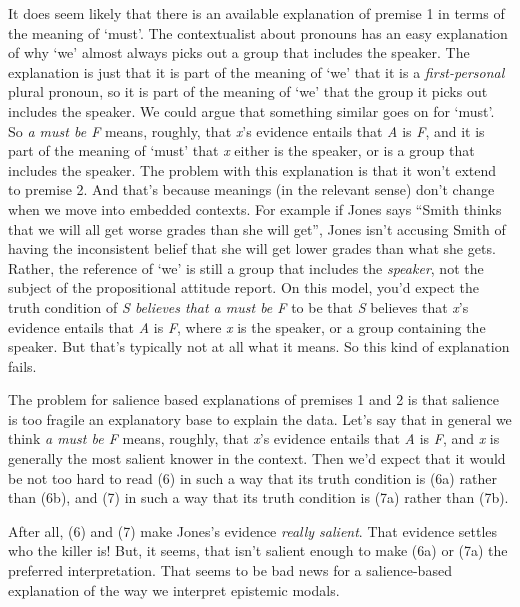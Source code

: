 \documentclass[
  10pt,
  letterpaper,
  DIV=11,
  numbers=noendperiod,
  twoside]{scrartcl}
\begin{document}
It does seem likely that there is an available explanation of premise 1
in terms of the meaning of `must'. The contextualist about pronouns has
an easy explanation of why `we' almost always picks out a group that
includes the speaker. The explanation is just that it is part of the
meaning of `we' that it is a \emph{first-personal} plural pronoun, so it
is part of the meaning of `we' that the group it picks out includes the
speaker. We could argue that something similar goes on for `must'. So
\emph{a must be F} means, roughly, that \emph{x}'s evidence entails that
\emph{A} is \emph{F}, and it is part of the meaning of `must' that
\emph{x} either is the speaker, or is a group that includes the speaker.
The problem with this explanation is that it won't extend to premise 2.
And that's because meanings (in the relevant sense) don't change when we
move into embedded contexts. For example if Jones says ``Smith thinks
that we will all get worse grades than she will get'', Jones isn't
accusing Smith of having the inconsistent belief that she will get lower
grades than what she gets. Rather, the reference of `we' is still a
group that includes the \emph{speaker}, not the subject of the
propositional attitude report. On this model, you'd expect the truth
condition of \emph{S believes that a must be F} to be that \emph{S}
believes that \emph{x}'s evidence entails that \emph{A} is \emph{F},
where \emph{x} is the speaker, or a group containing the speaker. But
that's typically not at all what it means. So this kind of explanation
fails.

The problem for salience based explanations of premises 1 and 2 is that
salience is too fragile an explanatory base to explain the data. Let's
say that in general we think \emph{a must be F} means, roughly, that
\emph{x}'s evidence entails that \emph{A} is \emph{F}, and \emph{x} is
generally the most salient knower in the context. Then we'd expect that
it would be not too hard to read (6) in such a way that its truth
condition is (6a) rather than (6b), and (7) in such a way that its truth
condition is (7a) rather than (7b).

After all, (6) and (7) make Jones's evidence \emph{really salient}. That
evidence settles who the killer is! But, it seems, that isn't salient
enough to make (6a) or (7a) the preferred interpretation. That seems to
be bad news for a salience-based explanation of the way we interpret
epistemic modals.
\end{document}
